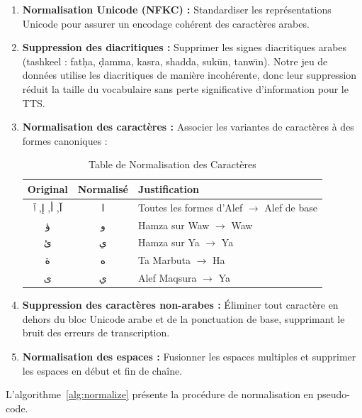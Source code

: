 \documentclass[12pt,a4paper]{article}
\begin{document}
\begin{enumerate}
    \item \textbf{Normalisation Unicode (NFKC) :} Standardiser les représentations Unicode pour assurer un encodage cohérent des caractères arabes.

    \item \textbf{Suppression des diacritiques :} Supprimer les signes diacritiques arabes (tashkeel : fat\d{h}a, \d{d}amma, kasra, shadda, suk\=un, tanw\={\i}n). Notre jeu de données utilise les diacritiques de manière incohérente, donc leur suppression réduit la taille du vocabulaire sans perte significative d'information pour le TTS.

    \item \textbf{Normalisation des caractères :} Associer les variantes de caractères à des formes canoniques :

    \begin{table}[H]
    \centering
    \caption{Table de Normalisation des Caractères}
    \label{tab:char_norm}
    \begin{tabular}{ccl}
    \toprule
    \textbf{Original} & \textbf{Normalisé} & \textbf{Justification} \\
    \midrule
    \textarabic{آ}, \textarabic{أ}, \textarabic{إ}, \textarabic{ٱ} & \textarabic{ا} & Toutes les formes d'Alef $\to$ Alef de base \\
    \textarabic{ؤ} & \textarabic{و} & Hamza sur Waw $\to$ Waw \\
    \textarabic{ئ} & \textarabic{ي} & Hamza sur Ya $\to$ Ya \\
    \textarabic{ة} & \textarabic{ه} & Ta Marbuta $\to$ Ha \\
    \textarabic{ى} & \textarabic{ي} & Alef Maqsura $\to$ Ya \\
    \bottomrule
    \end{tabular}
    \end{table}

    \item \textbf{Suppression des caractères non-arabes :} Éliminer tout caractère en dehors du bloc Unicode arabe et de la ponctuation de base, supprimant le bruit des erreurs de transcription.

    \item \textbf{Normalisation des espaces :} Fusionner les espaces multiples et supprimer les espaces en début et fin de chaîne.
\end{enumerate}

L'algorithme~\ref{alg:normalize} présente la procédure de normalisation en pseudo-code.
\end{document}
